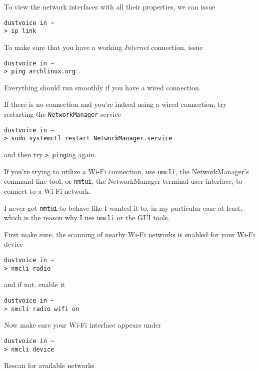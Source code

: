 \documentclass[10pt]{dustdoc}
\begin{document}
To view the network interfaces with all their properties, we can issue

\begin{verbatim}
dustvoice in ~
> ip link
\end{verbatim}

To make sure that you have a working \emph{Internet} connection, issue

\begin{verbatim}
dustvoice in ~
> ping archlinux.org
\end{verbatim}

Everything should run smoothly if you have a wired connection.

If there is no connection and you’re indeed using a wired connection, try restarting the \texttt{NetworkManager} service

\begin{verbatim}
dustvoice in ~
> sudo systemctl restart NetworkManager.service
\end{verbatim}

\noindent
and then try \texttt{> ping}ing again.

If you're trying to utilize a Wi-Fi connection, use \texttt{nmcli}, the NetworkManager's command line tool, or \texttt{nmtui}, the NetworkManager terminal user interface, to connect to a Wi-Fi network.

\begin{NOTE}
    I never got \texttt{nmtui} to behave like I wanted it to, in my particular case at least, which is the reason why I use \texttt{nmcli} or the GUI tools.
\end{NOTE}

First make sure, the scanning of nearby Wi-Fi networks is enabled for your Wi-Fi device

\begin{verbatim}
dustvoice in ~
> nmcli radio
\end{verbatim}

\noindent
and if not, enable it

\begin{verbatim}
dustvoice in ~
> nmcli radio wifi on
\end{verbatim}

Now make sure your Wi-Fi interface appears under

\begin{verbatim}
dustvoice in ~
> nmcli device
\end{verbatim}

Rescan for available networks
\end{document}
